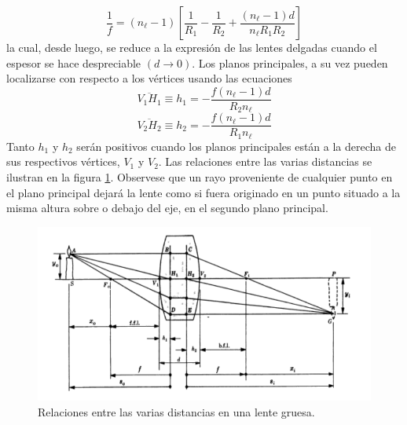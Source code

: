 \documentclass[13,twocolumn,letterpaper]{article}
\begin{document}
{\begin{equation}
		\dfrac{1}{f}=(n_{\ell}-1)\left[\dfrac{1}{R_{1}}-\dfrac{1}{R_{2}}+\dfrac{(n_{\ell}-1)d}{n_{\ell}R_{1}R_{2}}	\right]
	\end{equation}
	la cual, desde luego, se reduce a la expresi\'on de las lentes delgadas cuando el espesor se hace despreciable $(d\rightarrow 0)$. Los planos principales, a su vez pueden localizarse con respecto a los v\'ertices usando las ecuaciones
	\begin{equation}\label{ec3}
		\overline{V_{1}H_{1}}\equiv h_{1}=-\dfrac{f(n_{\ell}-1)d}{R_{2}n_{\ell}}
	\end{equation}
	\begin{equation}\label{ec4}
	\overline{V_{2}H_{2}}\equiv h_{2}=-\dfrac{f(n_{\ell}-1)d}{R_{1}n_{\ell}}
	\end{equation}
	Tanto $h_{1}$ y $h_{2}$ ser\'an positivos cuando los planos principales est\'an a la derecha de sus respectivos v\'ertices, $V_{1}$ y $V_{2}$. Las relaciones entre las varias distancias se ilustran en la figura \ref{fig:fig3}. Observese que un rayo proveniente de cualquier punto en el plano principal dejar\'a la lente como si fuera originado en un punto situado a la misma altura sobre o debajo del eje, en el segundo plano principal.
	\begin{figure}[h!]
		\centering
		\includegraphics[width=0.9\linewidth]{fig3}
		\caption{\footnotesize{Relaciones entre las varias distancias en una lente gruesa.}}
		\label{fig:fig3}
	\end{figure}
}
\end{document}

